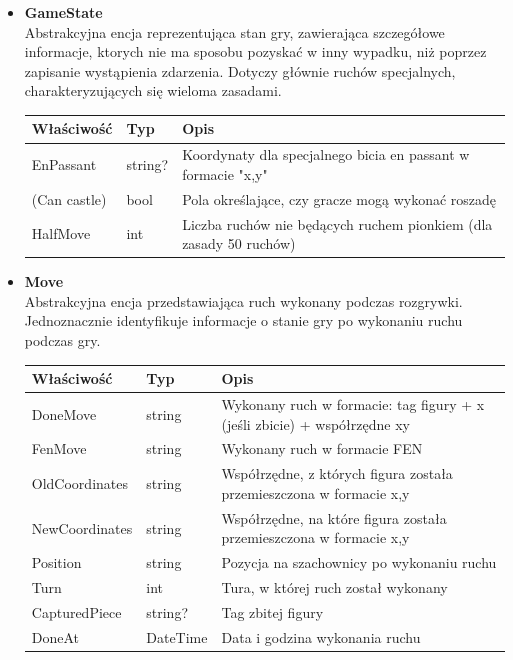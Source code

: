 \documentclass[12pt,a4paper]{article}
\begin{document}
\begin{itemize}
    \item \textbf{GameState}\\
    Abstrakcyjna encja reprezentująca stan gry, zawierająca szczegółowe informacje, ktorych nie ma sposobu pozyskać w inny wypadku, niż poprzez zapisanie wystąpienia zdarzenia. Dotyczy głównie ruchów specjalnych, charakteryzujących się wieloma zasadami.
    \renewcommand{\arraystretch}{1.5}
    \begin{longtable}{|m{4cm}|m{2cm}|m{8cm}|}
        \hline
        \rowcolor{lightgray}
        \textbf{Właściwość} & \textbf{Typ} & \textbf{Opis} \\ \hline
        \endhead
        \hline
        EnPassant & string? & Koordynaty dla specjalnego bicia en passant w formacie "x,y" \\ \hline
        (Can castle) & bool & Pola określające, czy gracze mogą wykonać roszadę \\ \hline
        HalfMove & int & Liczba ruchów nie będących ruchem pionkiem (dla zasady 50 ruchów) \\ \hline
    \end{longtable}

\newpage

    \item \textbf{Move}\\
    Abstrakcyjna encja przedstawiająca ruch wykonany podczas rozgrywki. Jednoznacznie identyfikuje informacje o stanie gry po wykonaniu ruchu podczas gry.
    \renewcommand{\arraystretch}{1.5}
    \begin{longtable}{|m{4cm}|m{2cm}|m{8cm}|}
        \hline
        \rowcolor{lightgray}
        \textbf{Właściwość} & \textbf{Typ} & \textbf{Opis} \\ \hline
        \endhead
        \hline
        DoneMove & string & Wykonany ruch w formacie: tag figury + x (jeśli zbicie) + współrzędne xy \\ \hline
        FenMove & string & Wykonany ruch w formacie FEN \\ \hline
        OldCoordinates & string & Współrzędne, z których figura została przemieszczona w formacie x,y \\ \hline
        NewCoordinates & string & Współrzędne, na które figura została przemieszczona w formacie x,y \\ \hline
        Position & string & Pozycja na szachownicy po wykonaniu ruchu \\ \hline
        Turn & int & Tura, w której ruch został wykonany \\ \hline
        CapturedPiece & string? & Tag zbitej figury \\ \hline
        DoneAt & DateTime & Data i godzina wykonania ruchu \\ \hline
    \end{longtable}


\end{itemize}
\end{document}
